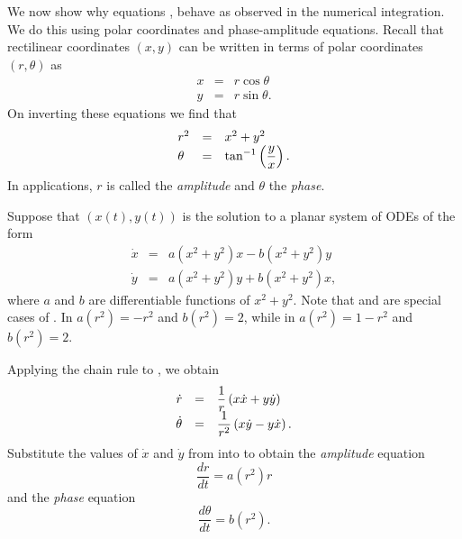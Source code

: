 \documentclass{ximera}
\begin{document}
We now show why equations , 
behave as observed in the numerical integration.  We do this using 
polar coordinates and phase-amplitude equations.  
Recall that rectilinear coordinates $(x,y)$ can be written in terms 
of polar coordinates $(r,\theta)$ as
\begin{eqnarray*}
x & = & r\cos\theta\\
y & = & r\sin\theta.
\end{eqnarray*}
On inverting these equations we find that
\arraystart
\begin{equation} \label{e:polarccord}
\begin{array}{lcl}
r^2 & = & x^2+y^2  \\
\theta & = & \displaystyle\tan^{-1}\left(\frac{y}{x}\right). 
\end{array}
\end{equation}
\arrayfinish
In applications, $r$ is called the {\em amplitude\/} and 
$\theta$ the {\em phase\/}.

Suppose that $(x(t),y(t))$ is the solution to a planar system of
ODEs of the form 
\begin{equation} \label{e:HopfNF}
\begin{array}{rcl}
\dot{x} & = & a(x^2+y^2)x - b(x^2+y^2)y\\
\dot{y} & = & a(x^2+y^2)y + b(x^2+y^2)x,
\end{array}
\end{equation}
where $a$ and $b$ are differentiable functions of $x^2+y^2$.
Note that  and  are special cases 
of .  In  $a(r^2)=-r^2$ and $b(r^2)=2$, 
while in  $a(r^2)=1-r^2$ and $b(r^2)=2$.

Applying the chain rule to , we obtain 
\arraystart
\begin{equation}  \label{e:polarder}
\begin{array}{rcl}
\dot{r} & = & \displaystyle\frac{1}{r}\left(x\dot{x} + y\dot{y}\right)\\ 
\dot{\theta} & = & \displaystyle\frac{1}{r^2}\left(x\dot{y}-y\dot{x}\right).
\end{array}
\end{equation}
\arrayfinish
Substitute the values of $\dot{x}$ and $\dot{y}$ from  into 
 to obtain the 
{\em amplitude\/} equation
\begin{equation} \label{e:amplitude}
\frac{dr}{dt}  =  a(r^2) r
\end{equation}
and the {\em phase\/} equation
\begin{equation} \label{e:phase}
\frac{d\theta}{dt} =  b(r^2).
\end{equation}
\end{document}
